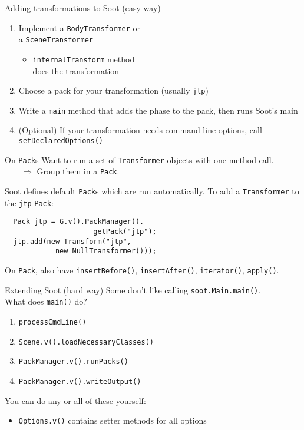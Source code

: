 \begin{slide}{Adding transformations to Soot (easy way)}
\vspace*{-0.1in}
\begin{enumerate}
\item Implement a \texttt{BodyTransformer} or\\ a \texttt{SceneTransformer}
\begin{itemize}
\item \texttt{internalTransform} method \\does the transformation
\end{itemize}
\item Choose a pack for your transformation (usually \texttt{jtp})
\item Write a \texttt{main} method that adds the phase to the pack, then
runs Soot's main
\item (Optional) If your transformation needs command-line options,
call \texttt{setDeclaredOptions()}
\end{enumerate}
\end{slide}

\begin{slide}{On {\tt Pack}s}
\vspace*{-0.2in}
Want to run a set of {\tt Transformer} objects with one method call.\\
$\qquad \Rightarrow$ Group them in a {\tt Pack}.

\vspace{0.1in}
Soot defines default {\tt Pack}s which are run automatically.
To add a {\tt Transformer} to the {\tt jtp} {\tt Pack}:
\begin{verbatim}
  Pack jtp = G.v().PackManager().
                     getPack("jtp");
  jtp.add(new Transform("jtp", 
            new NullTransformer()));
\end{verbatim}

On {\tt Pack}, also have {\tt insertBefore()}, {\tt insertAfter()},
{\tt iterator()}, {\tt apply()}.
\end{slide}

\begin{slide}{Extending Soot (hard way)}
Some don't like calling {\texttt{soot.Main.main()}}.\\
What does \texttt{main()} do?
\begin{enumerate}
\item \texttt{processCmdLine()}
\item \texttt{Scene.v().loadNecessaryClasses()}
\item \texttt{PackManager.v().runPacks()}
\item \texttt{PackManager.v().writeOutput()}
\end{enumerate}
You can do any or all of these yourself:
\begin{itemize}
\item \texttt{Options.v()} contains setter methods for all options
\end{itemize}
\end{slide}

